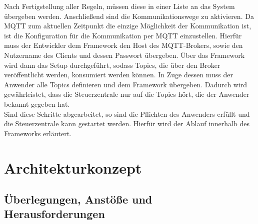         Nach Fertigstellung aller Regeln, müssen diese in einer Liste an das System übergeben werden. Anschließend sind die Kommunikationswege 
        zu aktivieren. 
        Da \acs{MQTT} zum aktuellen Zeitpunkt die einzige Möglichkeit der Kommunikation ist, ist die Konfiguration für die 
        Kommunikation per \acs{MQTT} einzustellen. Hierfür muss der Entwickler 
        dem Framework den Host des \acs{MQTT}-Brokers, sowie den Nutzername des Clients und dessen Passwort übergeben. Über das 
        Framework wird dann das Setup durchgeführt, sodass Topics, die über den Broker veröffentlicht werden, konsumiert werden können. 
        In Zuge dessen muss der Anwender alle Topics definieren und dem Framework übergeben. Dadurch wird gewährleistet, dass die 
        Steuerzentrale nur auf die Topics hört, die der Anwender bekannt gegeben hat. 
        \\
        Sind diese Schritte abgearbeitet, so sind die Pflichten des Anwenders erfüllt und die Steuerzentrale kann gestartet werden. 
        Hierfür wird der Ablauf innerhalb des Frameworks erläutert.
        \\
        \linebreak





\section{Architekturkonzept}
\label{sec:architekturkonzept}

    \subsection{Überlegungen, Anstöße und Herausforderungen}

